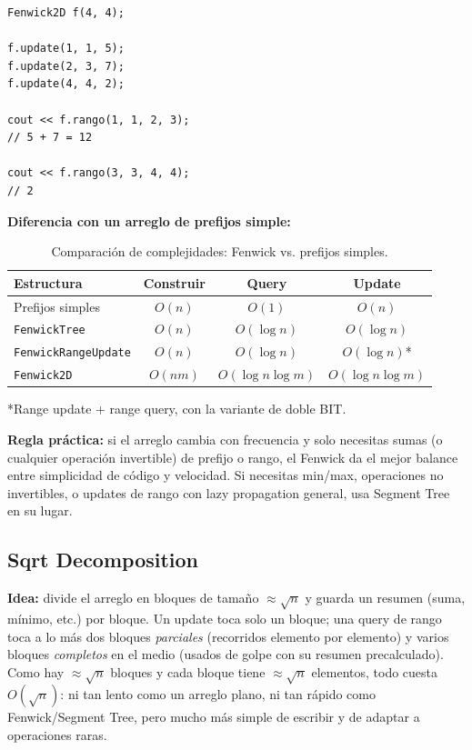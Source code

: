 \documentclass[10pt,a4paper,twocolumn]{article}
\begin{document}
\begin{lstlisting}[style=cpp]
Fenwick2D f(4, 4);

f.update(1, 1, 5);
f.update(2, 3, 7);
f.update(4, 4, 2);

cout << f.rango(1, 1, 2, 3);
// 5 + 7 = 12

cout << f.rango(3, 3, 4, 4);
// 2
\end{lstlisting}

\textbf{Diferencia con un arreglo de prefijos simple:}

\begin{table}[H]
\raggedright
\scriptsize
\setlength{\tabcolsep}{3pt}
\begin{tabular}{|l|c|c|c|}
\hline
\textbf{Estructura} & \textbf{Construir} & \textbf{Query} & \textbf{Update} \\
\hline
Prefijos simples & $O(n)$ & $O(1)$ & $O(n)$ \\
\hline
\texttt{FenwickTree} & $O(n)$ & $O(\log n)$ & $O(\log n)$ \\
\hline
\texttt{FenwickRangeUpdate} & $O(n)$ & $O(\log n)$ & $O(\log n)$* \\
\hline
\texttt{Fenwick2D} & $O(nm)$ & $O(\log n\log m)$ & $O(\log n\log m)$ \\
\hline
\end{tabular}
\caption{Comparación de complejidades: Fenwick vs. prefijos simples.}
\end{table}

\noindent
*Range update + range query, con la variante de doble BIT.

\textbf{Regla práctica:} si el arreglo cambia con frecuencia y solo
necesitas sumas (o cualquier operación invertible) de prefijo o rango,
el Fenwick da el mejor balance entre simplicidad de código y
velocidad. Si necesitas min/max, operaciones no invertibles, o updates
de rango con lazy propagation general, usa Segment Tree en su lugar.




\subsection{Sqrt Decomposition}

\textbf{Idea:} divide el arreglo en bloques de tamaño
$\approx\sqrt n$ y guarda un resumen (suma, mínimo, etc.) por bloque.
Un update toca solo un bloque; una query de rango toca a lo más dos
bloques \emph{parciales} (recorridos elemento por elemento) y varios
bloques \emph{completos} en el medio (usados de golpe con su resumen
precalculado). Como hay $\approx\sqrt n$ bloques y cada bloque tiene
$\approx\sqrt n$ elementos, todo cuesta $O(\sqrt n)$: ni tan lento
como un arreglo plano, ni tan rápido como Fenwick/Segment Tree, pero
mucho más simple de escribir y de adaptar a operaciones raras.
\end{document}
